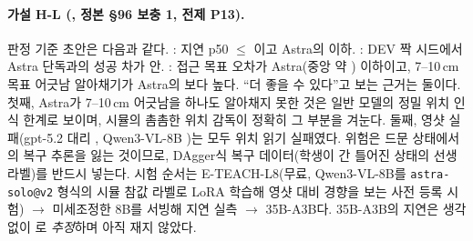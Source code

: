 \paragraph{가설 H-L (, 정본 §96 보충 1, 전제 P13).}  판정 기준 초안은 다음과 같다. : 지연 p50 $\le$ 이고 Astra의  이하. : DEV 짝 시드에서 Astra 단독과의 성공 차가  안. : 접근 목표 오차가 Astra(중앙 약 ) 이하이고, 7--10\,cm 목표 어긋남 알아채기가 Astra의 보다 높다. ``더 좋을 수 있다''고 보는 근거는 둘이다. 첫째, Astra가 7--10\,cm 어긋남을 하나도 알아채지 못한 것은 일반 모델의 정밀 위치 인식 한계로 보이며, 시뮬의 촘촘한 위치 감독이 정확히 그 부분을 겨눈다. 둘째, 영샷 실패(gpt-5.2 대리 , Qwen3-VL-8B )는 모두 위치 읽기 실패였다. 위험은 드문 상태에서의 복구 추론을 잃는 것이므로, DAgger식 복구 데이터(학생이 간 틀어진 상태의 선생 라벨)를 반드시 넣는다. 시험 순서는 E-TEACH-L8(무료, Qwen3-VL-8B를 \texttt{astra-solo@v2} 형식의 시뮬 참값 라벨로 LoRA 학습해 영샷 대비 경향을 보는 사전 등록 시험) $\rightarrow$ 미세조정한 8B를 서빙해 지연 실측 $\rightarrow$ 35B-A3B다. 35B-A3B의 지연은 생각 없이 로 \emph{추정}하며 아직 재지 않았다.

